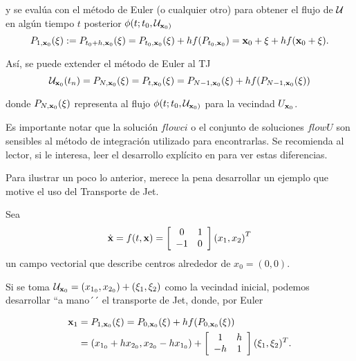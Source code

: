 y se evalúa con el método de Euler (o cualquier otro) para obtener el flujo de $\mathcal{U}$ en algún tiempo $t$ posterior $\phi(t;t_0,\mathcal{U}_{\mathbf{x}_0)}$
\begin{equation*}
P_{1,\mathbf{x}_0}(\xi) := P_{t_0+h,\mathbf{x}_0}(\xi) = P_{t_0,\mathbf{x}_0}(\xi) + h f(P_{t_0,\mathbf{x}_0}) = \mathbf{x}_0 + \xi + h f(\mathbf{x}_0 + \xi).
\end{equation*}

Así, se puede extender el método de Euler al TJ 
\begin{equation}
\mathcal{U}_{\mathbf{x}_0}(t_n) = P_{N,\mathbf{x}_0}(\xi) = P_{t,\mathbf{x}_0}(\xi) = P_{N-1,\mathbf{x}_0}(\xi) + h f(P_{N-1,\mathbf{x}_0}(\xi))
\label{eq:eulerU}
\end{equation}

donde $P_{N,\mathbf{x}_0}(\xi)$ representa al flujo $\phi(t;t_0,\mathcal{U}_{\mathbf{x}_0)}$ para la vecindad $U_{\mathbf{x}_0}$.

Es importante notar que la solución $flowci$ o el conjunto de soluciones $flowU$ son sensibles al método de integración utilizado para encontrarlas. Se recomienda al lector, si le interesa, leer el desarrollo explícito en \cite{p-palau} para ver estas diferencias.

Para ilustrar un poco lo anterior, merece la pena desarrollar un ejemplo que motive el uso del Transporte de Jet.

Sea
\begin{align}
\dot{\mathbf{x}} = f(t,\mathbf{x}) = \left[ \begin{array}{cc}
 0 & 1  \\
-1 & 0  \\
\end{array} \right] \left( x_1, x_2 \right)^T
\label{eq:center}
\end{align}
un campo vectorial que describe centros alrededor de $x_0 = (0,0)$. 

Si se toma $\mathcal{U}_{\mathbf{x}_0} = (x_{1_0},x_{2_0}) + (\xi_1,\xi_2)$ como la vecindad inicial, podemos desarrollar ``a mano´´ el transporte de Jet, donde, por Euler

\begin{align*}
\mathbf{x}_1 &= P_{1,\mathbf{x}_0}(\xi) = P_{0,\mathbf{x}_0}(\xi) + h f(P_{0,\mathbf{x}_0}(\xi)) \\
&= (x_{1_0} + h x_{2_0}, x_{2_0} - h x_{1_0}) + \left[ \begin{array}{cc}
 1 & h  \\
-h & 1  \\
\end{array} \right] (\xi_1,\xi_2)^T.
\end{align*} 

